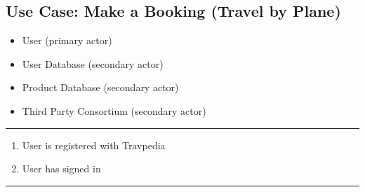 \vspace{4ex}
\hspace{-4.2cm}
\begin{minipage}[h][][s]{\linewidth}
	\subsection{Use Case: Make a Booking (Travel by Plane)}
\end{minipage}

\begin{itemize}
	\item User (primary actor)
	\item User Database  (secondary actor)
	\item Product Database  (secondary actor)
	\item Third Party Consortium (secondary actor)
\end{itemize}
\noindent\rule{\textwidth}{0.6pt}

\begin{enumerate}
	\item User is registered with Travpedia
	\item User has signed in
\end{enumerate}
\noindent\rule{\textwidth}{0.6pt}


